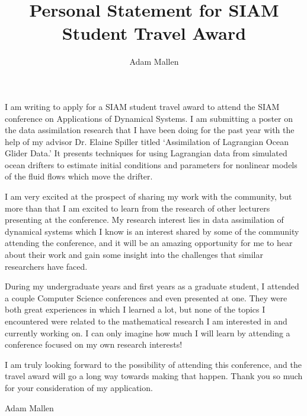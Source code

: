 \documentclass[12pt]{article}
\begin{document}
\title{Personal Statement for SIAM Student Travel Award}
\author{Adam Mallen}{}{}
\maketitle
\thispagestyle{empty}



I am writing to apply for a SIAM student travel award to attend the SIAM
conference on Applications of Dynamical Systems. 
I am submitting a poster on the data assimilation research that I have been
doing for the past year with the help of my advisor Dr. Elaine Spiller
titled `Assimilation of Lagrangian Ocean Glider Data.' 
It presents
techniques for using Lagrangian data from simulated ocean drifters to estimate
initial conditions and parameters for nonlinear models of the fluid flows which
move the drifter.

I am very excited at the prospect of sharing my work with the community, but
more than that I am excited to learn from the research of other lecturers
presenting at the conference. 
My research interest lies in data assimilation of dynamical systems which I
know is an interest shared by some of the community attending the conference,
and it will be an amazing opportunity for me to hear about their work and gain
some insight into the challenges that similar researchers have faced. 

During my undergraduate years and first years as a graduate student, I attended
a couple Computer Science conferences and even presented at one.
They were both great experiences in which I learned a lot, but none of the
topics I encountered were related to the mathematical research I am
interested in and currently working on.
I can only imagine how much I will learn by attending a conference focused on
my own research interests!

I am truly looking forward to the possibility of attending this conference,
and the travel award will go a long way towards making that happen.
Thank you so much for your consideration of my application.

\bigskip
\bigskip
Adam Mallen
\end{document}
